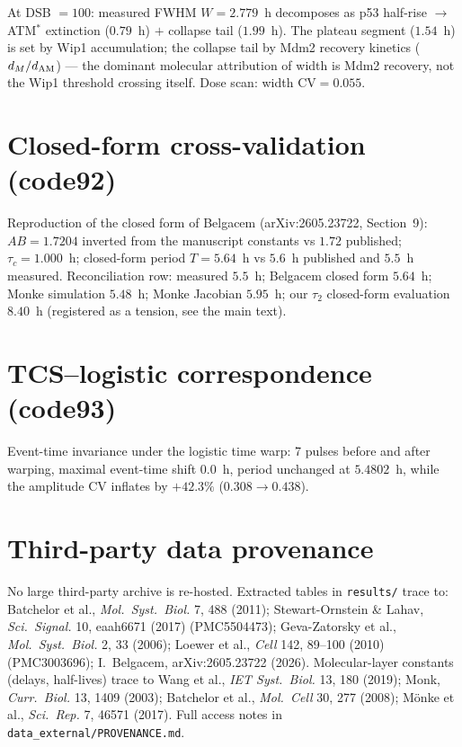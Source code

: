 \documentclass[11pt]{article}
\begin{document}
At DSB $=100$: measured FWHM $W=2.779$~h decomposes as
p53 half-rise $\to$ ATM$^*$ extinction ($0.79$~h) $+$ collapse tail
($1.99$~h). The plateau segment ($1.54$~h) is set by Wip1 accumulation;
the collapse tail by Mdm2 recovery kinetics ($d_M/d_{\rm AM}$) --- the
dominant molecular attribution of width is Mdm2 recovery, not the Wip1
threshold crossing itself. Dose scan: width $\mathrm{CV}=0.055$.

\section{Closed-form cross-validation (code92)}

Reproduction of the closed form of Belgacem
(arXiv:2605.23722, Section~9): $AB = 1.7204$ inverted from the manuscript
constants vs $1.72$ published; $\tau_c = 1.000$~h; closed-form period
$T=5.64$~h vs $5.6$~h published and $5.5$~h measured.
Reconciliation row: measured $5.5$~h; Belgacem closed form $5.64$~h;
Monke simulation $5.48$~h; Monke Jacobian $5.95$~h; our $\tau_2$
closed-form evaluation $8.40$~h (registered as a tension, see the main
text).

\section{TCS--logistic correspondence (code93)}

Event-time invariance under the logistic time warp: 7 pulses before and
after warping, maximal event-time shift $0.0$~h, period unchanged at
$5.4802$~h, while the amplitude CV inflates by $+42.3\%$
($0.308 \to 0.438$).

\section{Third-party data provenance}

No large third-party archive is re-hosted. Extracted tables in
\texttt{results/} trace to: Batchelor et al., \textit{Mol.\ Syst.\ Biol.}
7, 488 (2011); Stewart-Ornstein \& Lahav, \textit{Sci.\ Signal.} 10,
eaah6671 (2017) (PMC5504473); Geva-Zatorsky et al., \textit{Mol.\ Syst.\
Biol.} 2, 33 (2006); Loewer et al., \textit{Cell} 142, 89--100 (2010)
(PMC3003696); I.~Belgacem, arXiv:2605.23722 (2026). Molecular-layer
constants (delays, half-lives) trace to Wang et al., \textit{IET Syst.\
Biol.} 13, 180 (2019); Monk, \textit{Curr.\ Biol.} 13, 1409 (2003);
Batchelor et al., \textit{Mol.\ Cell} 30, 277 (2008); M\"onke et al.,
\textit{Sci.\ Rep.} 7, 46571 (2017). Full
access notes in \texttt{data\_external/PROVENANCE.md}.
\end{document}
